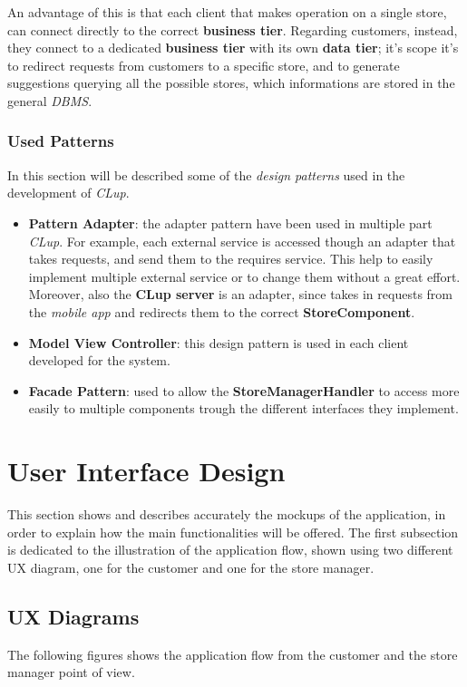 \documentclass{article}
\begin{document}
	An advantage of this is that each client that makes operation on a single store, can connect directly to the correct {\bfseries business tier}. Regarding customers, instead, they connect to a dedicated {\bfseries business tier} with its own {\bfseries data tier}; it's scope it's to redirect requests from customers to a specific store, and to generate suggestions querying all the possible stores, which informations are stored in the general \emph{DBMS}.
	\subsubsection{Used Patterns}
	In this section will be described some of the \emph{design patterns} used in the development of \emph{CLup}.
	\begin{itemize}
		\item {\bfseries Pattern Adapter}: the adapter pattern have been used in multiple part \emph{CLup}. For example, each external service is accessed though an adapter that takes requests, and send them to the requires service. This help to easily implement multiple external service or to change them without a great effort. Moreover, also the {\bfseries CLup server} is an adapter, since takes in requests from the \emph{mobile app} and redirects them to the correct {\bfseries StoreComponent}.
		\item{\bfseries Model View Controller}: this design pattern is used in each client developed for the system.
		\item{\bfseries Facade Pattern}: used to allow the {\bfseries StoreManagerHandler} to access more easily to multiple components trough the different interfaces they implement.
	\end{itemize}
	




\section{User Interface Design}
This section shows and describes accurately the mockups of the application, in order to explain how the main functionalities will be offered. The first subsection is dedicated to the illustration of the application flow, shown using two different UX diagram, one for the customer and one for the store manager.

	\subsection{UX Diagrams}
	The following figures shows the application flow from the customer and the store manager point of view.
	
\end{document}
